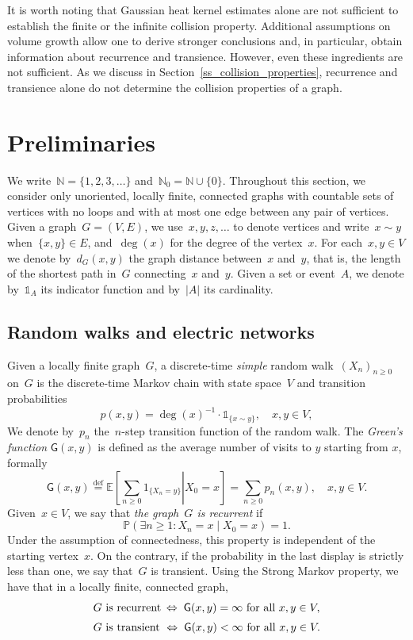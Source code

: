 \documentclass[a4paper,11pt]{article}
\newcommand{\eqdef}{\stackrel{\mathrm{def}}{=}}
\newcommand{\NN}{\mathbb{N}}
\theoremstyle{definition}
\begin{document}
It is worth noting that Gaussian heat kernel estimates alone are not sufficient to establish the finite or the infinite collision property. Additional assumptions on volume growth allow one to derive stronger conclusions and, in particular, obtain information about recurrence and transience. However, even these ingredients are not sufficient. As we discuss in Section~\ref{ss_collision_properties}, recurrence and transience alone do not determine the collision properties of a graph. 

\section{Preliminaries}
We write~$\NN = \{1,2,3,\dots\}$ and~$\NN_0 = \NN \cup \{0\}$. Throughout this section, we consider only unoriented, locally finite, connected graphs with countable sets of vertices with no loops and with at most one edge between any pair of vertices. Given a graph~$G = (V,E)$, we use~$x,y,z,\dots$ to denote vertices and write~$x \sim y$ when~$\{x,y\} \in E$, and~$\deg(x)$ for the degree of the vertex~$x$. For each~$x,y \in V$ we denote by~$d_G(x,y)$ the graph distance between~$x$ and~$y$, that is, the length of the shortest path in~$G$ connecting~$x$ and~$y$. Given a set or event~$A$, we denote by~$\mathds{1}_A$ its indicator function and by~$|A|$ its cardinality.

\subsection{Random walks and electric networks}\label{ss_rw_and_en}
Given a locally finite graph~$G$, a discrete-time \emph{simple} random walk~$(X_n)_{n \ge 0}$ on~$G$ is the discrete-time Markov chain with state space~$V$ and transition probabilities
\begin{equation}\label{eq_p_transition_srw}
p(x,y) = \deg(x)^{-1} \cdot \mathds 1_{ \{ x \sim y \} }, \quad x,y \in V,    
\end{equation}
We denote by~$p_n$ the~$n$-step transition function of the random walk. The \emph{Green's function} $\mathsf{G}(x,y)$ is defined as the average number of visits to $y$ starting from $x$, formally
\begin{equation*}
    \mathsf{G}(x,y) \eqdef \mathbb E \left. \left[\sum_{n\ge 0} 1_{\{X_n = y\}} \right|  X_0 = x \right]  = \sum_{n\ge 0} p_n(x,y), \quad x,y \in V.
\end{equation*}
Given~$x \in V$, we say that \emph{the graph~$G$ is recurrent} if 
\[
\mathbb P( \exists n \ge 1: X_n = x \mid X_0 = x )=1.
\]
Under the assumption of connectedness, this property is independent of the starting vertex~$x$. On the contrary, if the probability in the last display is strictly less than one, we say that~$G$ is transient. Using the Strong Markov property, we have that in a locally finite, connected graph, 
\begin{align*}
&G \text{ is recurrent } \hspace{-0.5mm} \Leftrightarrow \; \mathsf G(x,y) = \infty \text{ for all } x,y \in V, \\[1mm]
&G \text{ is transient }  \Leftrightarrow \; \mathsf G(x,y) < \infty \text{ for all } x,y \in V.
\end{align*}
\end{document}
